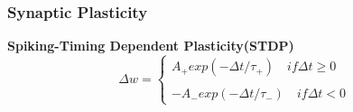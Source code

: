 \documentclass[10pt,aspectratio=43,mathserif, notes]{beamer}
\begin{document}
		\begin{frame}
		  \frametitle{\textbf{Synaptic Plasticity}}
		    \begin{block}{\textbf{Spiking-Timing Dependent Plasticity(STDP)}}
            \begin{equation}
                \Delta w = \left\{
                            \begin{array}{lr}
                             A_+exp(-\Delta t/\tau_+) \quad if \Delta t\geq 0\\
                            \\
                            -A_-exp(-\Delta t/\tau_-) \quad if \Delta t < 0
                            \end{array}
                            \right.
            \end{equation}
            \end{block}


\end{frame}
\end{document}
